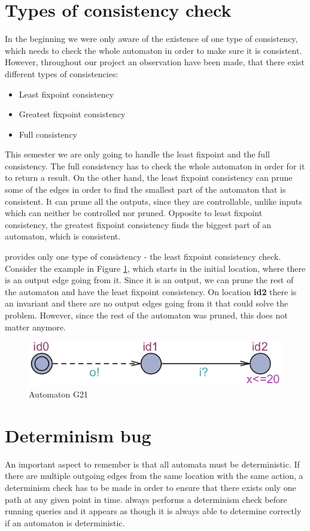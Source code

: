 \section{Types of consistency check}\label{sec:minConsistency}
In the beginning we were only aware of the existence of one type of consistency, which needs to check the whole automaton in order to make sure it is consistent. However, throughout our project an observation have been made, that there exist different types of consistencies: 
\begin{itemize}
    \item Least fixpoint consistency
    \item Greatest fixpoint consistency
    \item Full consistency
\end{itemize}
This semester we are only going to handle the least fixpoint and the full consistency. The full consistency has to check the whole automaton in order for it to return a result. On the other hand, the least fixpoint consistency can prune some of the edges in order to find the smallest part of the automaton that is consistent. It can prune all the outputs, since they are controllable, unlike inputs which can neither be controlled nor pruned. Opposite to least fixpoint consistency, the greatest fixpoint consistency finds the biggest part of an automaton, which is consistent.

\ecdar provides only one type of consistency - the least fixpoint consistency check. Consider the example in Figure \ref{fig:G21}, which starts in the initial location, where there is an output edge going from it. Since it is an output, we can prune the rest of the automaton and have the least fixpoint consistency. On location \textbf{id2} there is an invariant and there are no output edges going from it that could solve the problem. However, since the rest of the automaton was pruned, this does not matter anymore.
\begin{figure}
    \centering
    \includegraphics[scale = 0.7]{figures/G21.png}
    \caption{Automaton G21}
    \label{fig:G21}
\end{figure}

\section{Determinism bug}\label{sec:determBug}
An important aspect to remember is that all automata must be deterministic. If there are multiple outgoing edges from the same location with the same action, a determinism check has to be made in order to ensure that there exists only one path at any given point in time. \ecdar always performs a determinism check before running queries and it appears as though it is always able to determine correctly if an automaton is deterministic.


